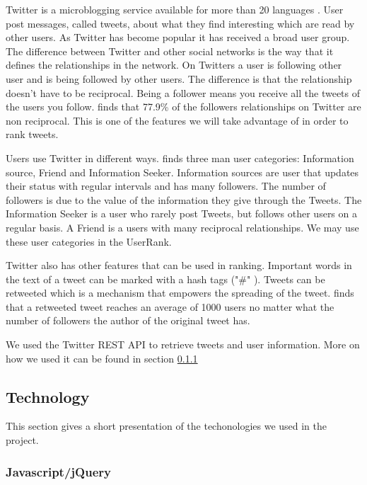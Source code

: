 Twitter is a microblogging service available for more than 20 languages \citep{Twitter2012}. User post messages, called tweets, about what they find interesting which are read by other users. As Twitter has become popular it has received a broad user group. The difference between Twitter and other social networks is the way  that it defines the relationships in the network. On Twitters a user is following other user and is being followed by other users. The difference is that the relationship doesn't have to be reciprocal. Being a follower means you receive all the tweets of the users you follow. \citep{Kwak2010} finds that 77.9\% of the followers relationships on Twitter are non reciprocal. This is one of the features we will take advantage of in order to rank tweets. 

Users use Twitter in different ways. \citet{Akshay2007} finds three man user categories: Information source, Friend and Information Seeker. Information sources are user that updates their status with regular intervals and has many followers. The number of followers is due to the value of the information they give through the Tweets. The Information Seeker is a user who rarely post Tweets, but follows other users on a regular basis. A Friend is a users with many reciprocal relationships. We may use these user categories in the UserRank. 

Twitter also has other features that can be used in ranking. Important words in the text of a tweet can be marked with a hash tags ("\#" ). Tweets can be retweeted which is a mechanism that empowers the spreading of the tweet. \citep{Kwak2010} finds that a retweeted tweet reaches an average of 1000 users no matter what the number of followers the author of the original tweet has. 

We used the Twitter REST API to retrieve tweets and user information. More on how we used it can be found in section \ref{} \nameref{} 

\subsection{Technology}
This section gives a short presentation of the techonologies we used in the project. 

\subsubsection{Javascript/jQuery} %
